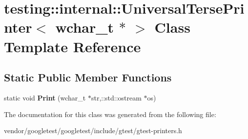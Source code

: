 \hypertarget{classtesting_1_1internal_1_1UniversalTersePrinter_3_01wchar__t_01_5_01_4}{}\section{testing\+:\+:internal\+:\+:Universal\+Terse\+Printer$<$ wchar\+\_\+t $\ast$ $>$ Class Template Reference}
\label{classtesting_1_1internal_1_1UniversalTersePrinter_3_01wchar__t_01_5_01_4}
\subsection*{Static Public Member Functions}
\begin{DoxyCompactItemize}
\item 
static void {\bfseries Print} (wchar\+\_\+t $\ast$str,\+::std\+::ostream $\ast$os)\hypertarget{classtesting_1_1internal_1_1UniversalTersePrinter_3_01wchar__t_01_5_01_4_af6009c8891ea3bdc190eddf76228305a}{}\label{classtesting_1_1internal_1_1UniversalTersePrinter_3_01wchar__t_01_5_01_4_af6009c8891ea3bdc190eddf76228305a}

\end{DoxyCompactItemize}


The documentation for this class was generated from the following file\+:\begin{DoxyCompactItemize}
\item 
vendor/googletest/googletest/include/gtest/gtest-\/printers.\+h\end{DoxyCompactItemize}
